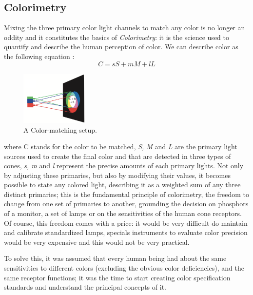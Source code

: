 \documentclass{report}
\begin{document}
\subsection{Colorimetry}
Mixing the three primary color light channels to match any color is no longer an oddity and it constitutes
the basics of \emph{Colorimetry}: it is the science used to quantify and describe the human perception of color.
We can describe color as the following equation \cite{Ware2012}: 
\begin{equation}
C = sS + mM + lL
\end{equation}
%
\begin{figure}
	\centering
    \includegraphics[width=0.3\textwidth]{Trichromacy.png}
	\caption[Trichromacy Theory]{A Color-matching setup. \cite{Ware2012}}
\end{figure}
%
where C stands for the color to be matched, \emph{S, M} and \emph{L} are the primary light sources used to create the final
color and that are detected in three types of cones, \emph{s, m} and \emph{l} represent the precise amounts of each primary
lights. Not only by adjusting these primaries, but also by modifying their values, it becomes possible to
state any colored light, describing it as a weighted
sum of any three distinct primaries; this is the fundamental principle of colorimetry, the freedom to change from
one set of primaries to another, grounding the decision on phosphors of a monitor, a set of lamps or on the
sensitivities of the human cone receptors. Of course, this freedom comes with a price: it would be very difficult
do maintain and calibrate standardized lamps, specials instruments to evaluate color precision would be very
expensive and this would not be very practical. \par 
To solve this, it was assumed that every human being had about the
same sensitivities to different colors (excluding the obvious color deficiencies), and the same receptor functions;
it was the time to start creating color specification standards and understand the principal concepts of it. 
%
\end{document}
